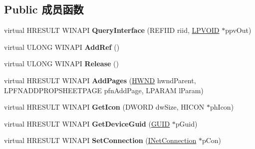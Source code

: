 \subsection*{Public 成员函数}
\begin{DoxyCompactItemize}
\item 
\mbox{\label{class_c_net_connection_property_ui_a0a1fbb6ea9ad9ed25f96f74e085d0d4e}} 
virtual H\+R\+E\+S\+U\+LT W\+I\+N\+A\+PI {\bfseries Query\+Interface} (R\+E\+F\+I\+ID riid, \hyperlink{interfacevoid}{L\+P\+V\+O\+ID} $\ast$ppv\+Out)
\item 
\mbox{\label{class_c_net_connection_property_ui_a68d93ee5de189bd9675a3cc0154f6442}} 
virtual U\+L\+O\+NG W\+I\+N\+A\+PI {\bfseries Add\+Ref} ()
\item 
\mbox{\label{class_c_net_connection_property_ui_afa89201cc66732e93314a118708a4f5e}} 
virtual U\+L\+O\+NG W\+I\+N\+A\+PI {\bfseries Release} ()
\item 
\mbox{\label{class_c_net_connection_property_ui_a67c102232b318c384c1d80059853d203}} 
virtual H\+R\+E\+S\+U\+LT W\+I\+N\+A\+PI {\bfseries Add\+Pages} (\hyperlink{interfacevoid}{H\+W\+ND} hwnd\+Parent, L\+P\+F\+N\+A\+D\+D\+P\+R\+O\+P\+S\+H\+E\+E\+T\+P\+A\+GE pfn\+Add\+Page, L\+P\+A\+R\+AM l\+Param)
\item 
\mbox{\label{class_c_net_connection_property_ui_a98955409f1af2853a0deb3aded1aca38}} 
virtual H\+R\+E\+S\+U\+LT W\+I\+N\+A\+PI {\bfseries Get\+Icon} (D\+W\+O\+RD dw\+Size, H\+I\+C\+ON $\ast$ph\+Icon)
\item 
\mbox{\label{class_c_net_connection_property_ui_ac06b33d1c884b5a8a090b66d544a0f02}} 
virtual H\+R\+E\+S\+U\+LT W\+I\+N\+A\+PI {\bfseries Get\+Device\+Guid} (\hyperlink{interface_g_u_i_d}{G\+U\+ID} $\ast$p\+Guid)
\item 
\mbox{\label{class_c_net_connection_property_ui_a5f974529af370115676a53b62a38c422}} 
virtual H\+R\+E\+S\+U\+LT W\+I\+N\+A\+PI {\bfseries Set\+Connection} (\hyperlink{interface_i_net_connection}{I\+Net\+Connection} $\ast$p\+Con)

\end{DoxyCompactItemize}
